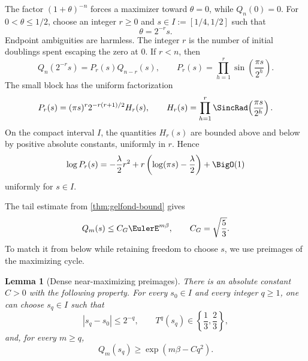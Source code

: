 \documentclass[11pt,oneside]{article}
\newtheorem{lemma}[lemma]{Lemma}
\theoremstyle{definition}
\theoremstyle{remark}
\begin{document}
The factor \((1+\theta)^{-n}\) forces a maximizer toward \(\theta=0\), while
\(Q_n(0)=0\).  For \(0<\theta\le1/2\), choose an integer \(r\ge0\) and
\(s\in I:=[1/4,1/2]\) such that
\begin{equation}
 \theta=2^{-r}s.
 \label{eq:transition-coordinates}
\end{equation}
Endpoint ambiguities are harmless.  The integer \(r\) is the number of
initial doublings spent escaping the zero at \(0\).  If \(r<n\), then
\begin{equation}
 Q_n(2^{-r}s)=P_r(s)Q_{n-r}(s),
 \qquad
 P_r(s)=\prod_{h=1}^{r}\sin\!\left(\frac{\pi s}{2^h}\right).
 \label{eq:Q-transition-factorization}
\end{equation}
The small block has the uniform factorization
\begin{equation}
 P_r(s)
 =(\pi s)^r2^{-r(r+1)/2}H_r(s),
 \qquad
 H_r(s)=\prod_{h=1}^{r}
 \SincRad\!\left(\frac{\pi s}{2^h}\right).
 \label{eq:small-block-factorization}
\end{equation}
On the compact interval \(I\), the quantities \(H_r(s)\) are bounded above
and below by positive absolute constants, uniformly in \(r\).  Hence
\begin{equation}
 \log P_r(s)
 =-\frac{\lambda}{2}r^2
 +r\left(\log(\pi s)-\frac\lambda2\right)
 +\BigO(1)
 \label{eq:small-block-log}
\end{equation}
uniformly for \(s\in I\).

The tail estimate from \cref{thm:gelfond-bound} gives
\begin{equation}
 Q_m(s)\le C_G\EulerE^{m\beta},
 \qquad C_G=\sqrt{\frac53}.
 \label{eq:tail-upper}
\end{equation}
To match it from below while retaining freedom to choose \(s\), we use
preimages of the maximizing cycle.

\begin{lemma}[Dense near-maximizing preimages]
\label{lem:dense-preimages}
There is an absolute constant \(C>0\) with the following property.  For every
\(s_0\in I\) and every integer \(q\ge1\), one can choose
\(s_q\in I\) such that
\begin{equation}
 |s_q-s_0|\le2^{-q},
 \qquad
 T^q(s_q)\in\left\{\frac13,\frac23\right\},
 \label{eq:preimage-approximation}
\end{equation}
and, for every \(m\ge q\),
\begin{equation}
 Q_m(s_q)\ge\exp(m\beta-Cq^2).
 \label{eq:preimage-tail-lower}
\end{equation}
\end{lemma}
\end{document}

